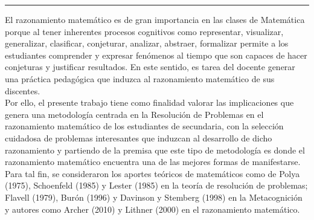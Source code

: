 \begin{titlepage}
\begin{minipage}{0.5\linewidth}
\begin{minipage}{0.45\linewidth}
    \begin{flushright}
        \printauthor
    \end{flushright}
\end{minipage} \hspace{-3pt}
%
\begin{minipage}{0.02\linewidth}
   \color{ptctitle} \rule{1pt}{225pt}
\end{minipage} 
\end{minipage}
\hspace*{-4.5cm}
%
\begin{minipage}{0.85\linewidth}
\begin{minipage}{0.85\linewidth}
\footnotesize
\vspace{5pt}
    \begin{resumen}
   El razonamiento matem\'atico es de gran importancia en las clases de Matem\'atica porque al tener inherentes procesos cognitivos como representar, visualizar, generalizar, clasificar, conjeturar, analizar, abstraer, formalizar permite a los estudiantes comprender y expresar fen\'omenos al tiempo que son capaces de hacer conjeturas y justificar resultados. En este sentido, es tarea del docente generar una pr\'actica pedag\'ogica que induzca al razonamiento matem\'atico de sus discentes.\\
 Por ello, el presente trabajo tiene como finalidad valorar las implicaciones que genera una metodolog\'ia centrada en la Resoluci\'on de Problemas en el razonamiento matem\'atico de los estudiantes de secundaria, con la selecci\'on cuidadosa de problemas interesantes que induzcan al desarrollo de dicho razonamiento y partiendo de la premisa que este tipo de metodolog\'ia es donde el razonamiento matem\'atico encuentra una de las mejores formas de manifestarse.\\
Para tal fin, se consideraron los aportes te\'oricos de matem\'aticos como de Polya (1975), Schoenfeld (1985) y Lester (1985) en la teor\'ia de resoluci\'on de problemas; Flavell (1979), Bur\'on (1996) y Davinson y Stemberg (1998) en la Metacognici\'on y autores como Archer (2010) y Lithner (2000) en el razonamiento matem\'atico.
    \end{resumen}
\end{minipage}
\vspace*{5pt}\\
\footnotesize
%  
    

\end{minipage}
\end{titlepage}
